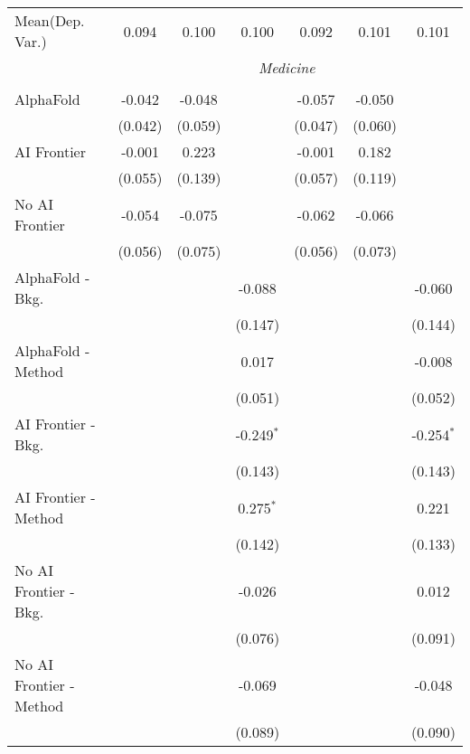 \begin{tabular}{lcccccc}
Mean(Dep. Var.) & 0.094 & 0.100 & 0.100 & 0.092 & 0.101 & 0.101 \\
 & \multicolumn{6}{c}{\textit{Medicine}} \\ \\
   AlphaFold               & -0.042  & -0.048  &              & -0.057  & -0.050  &   \\   
                           & (0.042) & (0.059) &              & (0.047) & (0.060) &   \\   
   AI Frontier             & -0.001  & 0.223   &              & -0.001  & 0.182   &   \\   
                           & (0.055) & (0.139) &              & (0.057) & (0.119) &   \\   
   No AI Frontier          & -0.054  & -0.075  &              & -0.062  & -0.066  &   \\   
                           & (0.056) & (0.075) &              & (0.056) & (0.073) &   \\   
   AlphaFold - Bkg.        &         &         & -0.088       &         &         & -0.060\\   
                           &         &         & (0.147)      &         &         & (0.144)\\   
   AlphaFold - Method      &         &         & 0.017        &         &         & -0.008\\   
                           &         &         & (0.051)      &         &         & (0.052)\\   
   AI Frontier - Bkg.      &         &         & -0.249$^{*}$ &         &         & -0.254$^{*}$\\   
                           &         &         & (0.143)      &         &         & (0.143)\\   
   AI Frontier - Method    &         &         & 0.275$^{*}$  &         &         & 0.221\\   
                           &         &         & (0.142)      &         &         & (0.133)\\   
   No AI Frontier - Bkg.   &         &         & -0.026       &         &         & 0.012\\   
                           &         &         & (0.076)      &         &         & (0.091)\\   
   No AI Frontier - Method &         &         & -0.069       &         &         & -0.048\\   
                           &         &         & (0.089)      &         &         & (0.090)\\   

\end{tabular}
